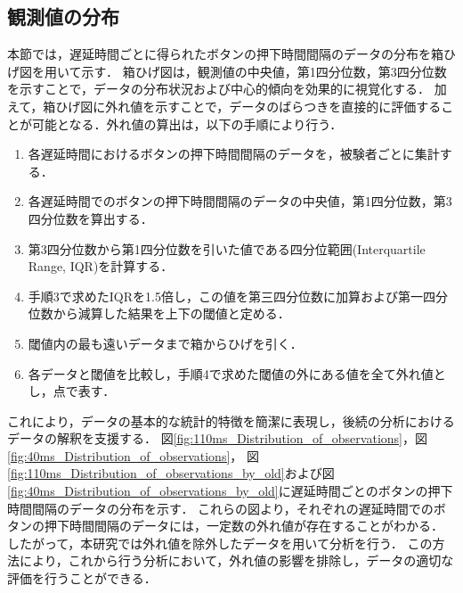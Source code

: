 \subsection{観測値の分布}
本節では，遅延時間ごとに得られたボタンの押下時間間隔のデータの分布を箱ひげ図を用いて示す．
箱ひげ図は，観測値の中央値，第1四分位数，第3四分位数を示すことで，データの分布状況および中心的傾向を効果的に視覚化する．
加えて，箱ひげ図に外れ値を示すことで，データのばらつきを直接的に評価することが可能となる．外れ値の算出は，以下の手順により行う．
\begin{enumerate}[leftmargin=*]
  \item 各遅延時間におけるボタンの押下時間間隔のデータを，被験者ごとに集計する．
  \item 各遅延時間でのボタンの押下時間間隔のデータの中央値，第1四分位数，第3四分位数を算出する．
  \item 第3四分位数から第1四分位数を引いた値である四分位範囲(Interquartile Range, IQR)を計算する．
  \item 手順3で求めたIQRを1.5倍し，この値を第三四分位数に加算および第一四分位数から減算した結果を上下の閾値と定める．
  \item 閾値内の最も遠いデータまで箱からひげを引く．
  \item 各データと閾値を比較し，手順4で求めた閾値の外にある値を全て外れ値とし，点で表す．
\end{enumerate}
これにより，データの基本的な統計的特徴を簡潔に表現し，後続の分析におけるデータの解釈を支援する．
図\ref{fig:110ms_Distribution_of_observations}，図\ref{fig:40ms_Distribution_of_observations}，
図\ref{fig:110ms_Distribution_of_observations_by_old}および図\ref{fig:40ms_Distribution_of_observations_by_old}に遅延時間ごとのボタンの押下時間間隔のデータの分布を示す．
これらの図より，それぞれの遅延時間でのボタンの押下時間間隔のデータには，一定数の外れ値が存在することがわかる．
したがって，本研究では外れ値を除外したデータを用いて分析を行う．
この方法により，これから行う分析において，外れ値の影響を排除し，データの適切な評価を行うことができる．

